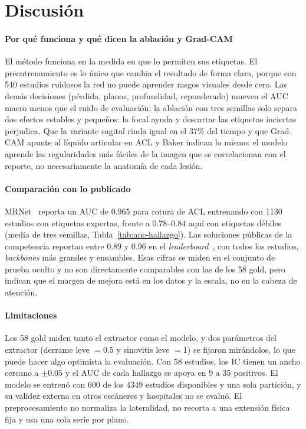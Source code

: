 \documentclass[conference]{IEEEtran}
\begin{document}
\section{Discusión}
\label{sec:discusion}

\paragraph*{Por qué funciona y qué dicen la ablación y Grad-CAM}
El método funciona en la medida en que lo permiten sus etiquetas.
El preentrenamiento es lo único que cambia el resultado de forma clara, porque con 540 estudios ruidosos la red no puede aprender rasgos visuales desde cero.
Las demás decisiones (pérdida, planos, profundidad, reponderado) mueven el AUC macro menos que el ruido de evaluación; la ablación con tres semillas solo separa dos efectos estables y pequeños: la focal ayuda y descartar las etiquetas inciertas perjudica.
Que la variante sagital rinda igual en el 37\% del tiempo y que Grad-CAM apunte al líquido articular en ACL y Baker indican lo mismo: el modelo aprende las regularidades más fáciles de la imagen que se correlacionan con el reporte, no necesariamente la anatomía de cada lesión.

\paragraph*{Comparación con lo publicado}
MRNet~\cite{bien2018mrnet} reporta un AUC de 0.965 para rotura de ACL entrenando con 1130 estudios con etiquetas expertas, frente a 0.78--0.84 aquí con etiquetas débiles (media de tres semillas, Tabla~\ref{tab:auc-hallazgo}).
Las soluciones públicas de la competencia reportan entre 0.89 y 0.96 en el \emph{leaderboard}~\cite{pilkwang2026baseline,dread2026twelve,ab29knee,bishnoi2026rsna}, con todos los estudios, \emph{backbones} más grandes y ensambles.
Esas cifras se miden en el conjunto de prueba oculto y no son directamente comparables con las de los 58 gold, pero indican que el margen de mejora está en los datos y la escala, no en la cabeza de atención.

\paragraph*{Limitaciones}
Los 58 gold miden tanto el extractor como el modelo, y dos parámetros del extractor (derrame leve $=0.5$ y sinovitis leve $=1$) se fijaron mirándolos, lo que puede hacer algo optimista la evaluación.
Con 58 estudios, los IC tienen un ancho cercano a $\pm0.05$ y el AUC de cada hallazgo se apoya en 9 a 35 positivos.
El modelo se entrenó con 600 de los 4349 estudios disponibles y una sola partición, y su validez externa en otros escáneres y hospitales no se evaluó.
El preprocesamiento no normaliza la lateralidad, no recorta a una extensión física fija y usa una sola serie por plano.
\end{document}
